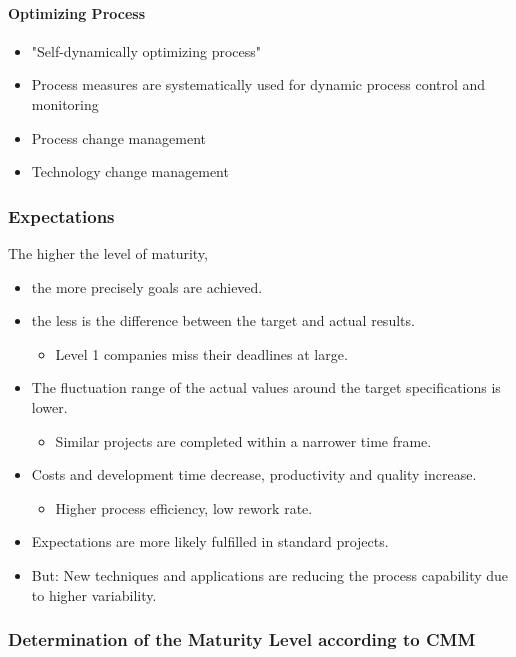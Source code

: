 \documentclass[11pt,a4paper]{article}
\begin{document}
\paragraph {Optimizing Process}
\begin {itemize} [noitemsep]
\item "Self-dynamically optimizing process" 
\item Process measures are systematically used for dynamic process control and
  monitoring
\item Process change management
\item Technology change management
\end {itemize}

\subsubsection{Expectations}
The higher the level of maturity, 
\begin {itemize} [noitemsep]
\item the more precisely goals are achieved.
\item the less is the difference between the target and actual results.
  \begin {itemize} [noitemsep]
  \item Level 1 companies miss their deadlines at large. 
  \end {itemize}
\item The fluctuation range of the actual values around the target
  specifications is lower.
  \begin {itemize} [noitemsep]
  \item Similar projects are completed within a narrower time frame.
  \end {itemize}
\item Costs and development time decrease, productivity and quality increase.
  \begin {itemize} [noitemsep]
  \item Higher process efficiency, low rework rate.
  \end {itemize}
\item Expectations are more likely fulfilled in standard projects.
\item But: New techniques and applications are reducing the process capability
  due to higher variability.
\end {itemize}

\subsubsection{Determination of the Maturity Level according to CMM}
\end{document}
